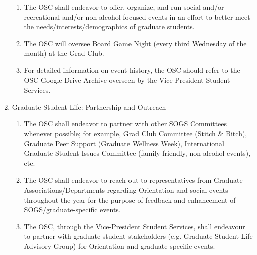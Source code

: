 \begin{enumerate}[label*=\arabic*., align=left]
\begin{enumerate}[label*=\arabic*., align=left]
	\item The OSC shall endeavor to offer, organize, and run social and/or recreational and/or non-alcohol focused events in an effort to better meet the needs/interests/demographics of graduate students.
	\item The OSC will oversee Board Game Night (every third Wednesday of the month) at the Grad Club.
	\item For detailed information on event history, the OSC should refer to the OSC Google Drive Archive overseen by the Vice-President Student Services.
	\end{enumerate}
	\item Graduate Student Life: Partnership and Outreach
	\begin{enumerate}[label*=\arabic*., align=left]	
	\item The OSC shall endeavor to partner with other SOGS Committees whenever possible; for example, Grad Club Committee (Stitch \& Bitch), Graduate Peer Support (Graduate Wellness Week), International Graduate Student Issues Committee (family friendly, non-alcohol events), etc.
	\item The OSC shall endeavor to reach out to representatives from Graduate Associations/Departments regarding Orientation and social events throughout the year for the purpose of feedback and enhancement of SOGS/graduate-specific events.
	\item The OSC, through the Vice-President Student Services, shall endeavour to partner with graduate student stakeholders (e.g. Graduate Student Life Advisory Group) for Orientation and graduate-specific events.
	\end{enumerate}
	\end{enumerate}